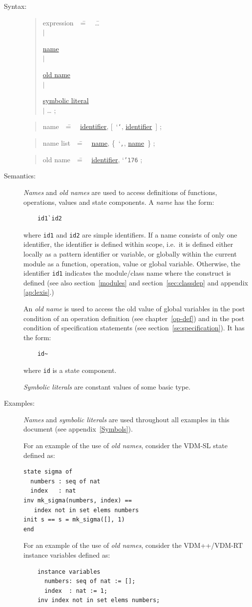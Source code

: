 \documentclass{overturerepchap}
\newcommand{\Lit}[1]{`{\tt #1}\Quote}
\newcommand{\Rule}[2]{
  \begin{quote}\begin{tabbing}
    #1\index{#1}\ \ \= = \ \ \= #2  ; %
    
  \end{tabbing}\end{quote}
  }
\newcommand{\Ruleref}[1]{
  \hyperlink{rule:#1}{#1}}
\newcommand{\SeqPt}[1]{\{\ #1\ \}}
\newcommand{\dsep}{\\ \> $|$ \>}
\newcommand{\OptPt}[1]{[\ #1\ ]}
\begin{document}
\begin{description}
\item[Syntax:]
  \Rule{expression}{    \ldots \dsep
    \Ruleref{name} \dsep
    \Ruleref{old name} \dsep
    \Ruleref{symbolic literal} \dsep
    \ldots
    }

  \Rule{name}{
    \Ruleref{identifier}, \OptPt{\Lit{`}, \Ruleref{identifier}}
    }

  \Rule{name list}{
    \Ruleref{name}, \SeqPt{\Lit{,}, \Ruleref{name}}
    }

  \Rule{old name}{
    \Ruleref{identifier}, \Lit{\char'176}
    }

\item[Semantics:] {\it Names\/} and {\it old names\/} are used to access
  definitions of functions, operations, values and state components. A {\it
    name\/} has the form:
  \begin{lstlisting}
    id1`id2
  \end{lstlisting}
  where {\tt id1} and {\tt id2} are simple identifiers. If a name consists
  of only one identifier, the identifier is defined within scope, i.e.\ it
  is defined either locally as a pattern identifier or variable,
  or globally within the current module as a function, operation,
  value or global variable. 
  Otherwise, the identifier {\tt id1} indicates the
module/class name
where the
  construct is defined (see also
  section~\ref{modules} and
  section~\ref{sec:classdep}
and appendix \ref{ap:lexis}.)

  An {\it old name\/} is used to access the old value of global
  variables in the post condition of an operation definition (see
  chapter~\ref{op-def}) and in the post condition of specification
  statements (see section~\ref{se:specification}).  It has the form:

  \begin{lstlisting} 
    id~ 
  \end{lstlisting} 
  where {\tt id} is a state component.

  {\it Symbolic literals\/} are constant values of some basic type.

\item[Examples:] {\it Names} and {\it symbolic literals\/} are used
  throughout all examples in this document (see appendix~\ref{Symbols}).

  For an example of the use of {\it old names}, consider the VDM-SL
  state defined as:
  \begin{lstlisting}
state sigma of
  numbers : seq of nat
  index   : nat
inv mk_sigma(numbers, index) == 
   index not in set elems numbers
init s == s = mk_sigma([], 1)
end
  \end{lstlisting}
  For an example of the use of {\it old names}, consider the
  VDM++/VDM-RT instance variables defined as:
  \begin{lstlisting}
    instance variables
      numbers: seq of nat := [];
      index  : nat := 1;
    inv index not in set elems numbers;
  \end{lstlisting}


\end{description}
\end{document}
